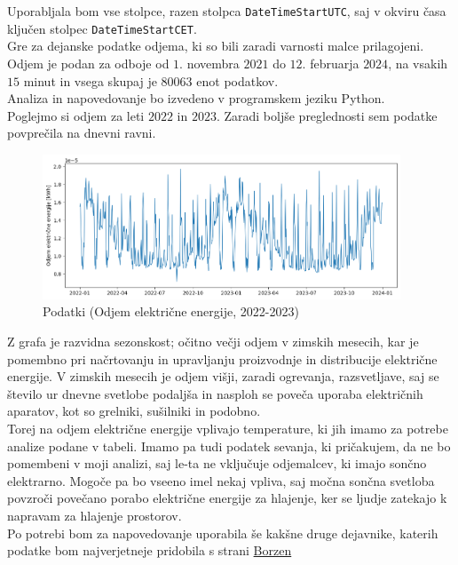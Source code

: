 \documentclass[a4paper, 10pt]{article}
\begin{document}
\noindent Uporabljala bom vse stolpce, razen stolpca \texttt{DateTimeStartUTC}, saj v 
okviru časa ključen stolpec \texttt{DateTimeStartCET}.  \\

\noindent Gre za dejanske podatke odjema, ki so bili zaradi varnosti malce prilagojeni. \\

\noindent Odjem je podan za odboje od $1$. novembra $2021$ do $12$. februarja $2024$, na vsakih $15$ minut in vsega skupaj je $80063$ enot podatkov. \\

\noindent Analiza in napovedovanje bo izvedeno v programskem jeziku Python. \\

\noindent Poglejmo si odjem za leti $2022$ in $2023$. Zaradi boljše preglednosti sem podatke povprečila na dnevni ravni.

\begin{figure}[h!]
    \centering
    \caption{Podatki (Odjem električne energije, 2022-2023)}\par\medskip
    \includegraphics[width=0.95\textwidth]{output.png}
\end{figure}

\noindent Z grafa je razvidna sezonskost; očitno večji odjem v zimskih mesecih, kar je pomembno pri 
načrtovanju in upravljanju proizvodnje in distribucije električne energije. 
V zimskih mesecih je odjem višji, zaradi ogrevanja, razsvetljave, saj se število ur 
dnevne svetlobe podaljša in nasploh se poveča uporaba električnih aparatov, kot 
so grelniki, sušilniki in podobno.  \\

\noindent Torej na odjem električne energije vplivajo temperature, 
ki jih imamo za potrebe analize podane v tabeli. Imamo pa tudi podatek 
sevanja, ki pričakujem, da ne bo pomembeni v moji analizi, saj le-ta ne 
vključuje odjemalcev, ki imajo sončno elektrarno. Mogoče pa bo vseeno 
imel nekaj vpliva, saj močna sončna svetloba povzroči povečano porabo 
električne energije za hlajenje, ker se ljudje zatekajo k napravam za 
hlajenje prostorov. \\

\noindent Po potrebi bom za napovedovanje uporabila še kakšne druge dejavnike, katerih podatke bom najverjetneje pridobila s strani \href{https://ot.borzen.si/Domov/Podatki-trga/Koli%C4%8Dine-in-zneski-izravnave}{Borzen}
\end{document}
